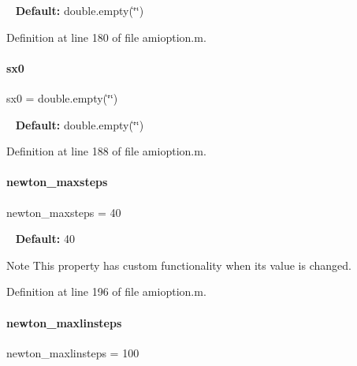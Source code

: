 ~\newline
{\bfseries Default\+:} double.\+empty(\char`\"{}\char`\"{}) 

Definition at line 180 of file amioption.\+m.

\mbox{\label{classamioption_ae40f9a7172d3a41725c151afaec347f7}} 
\paragraph{\texorpdfstring{sx0}{sx0}}
{\footnotesize\ttfamily sx0 = double.\+empty(\char`\"{}\char`\"{})}

~\newline
{\bfseries Default\+:} double.\+empty(\char`\"{}\char`\"{}) 

Definition at line 188 of file amioption.\+m.

\mbox{\label{classamioption_a003c445698766726237b11dc6e5120fe}} 
\paragraph{\texorpdfstring{newton\+\_\+maxsteps}{newton\_maxsteps}}
{\footnotesize\ttfamily newton\+\_\+maxsteps = 40}

~\newline
{\bfseries Default\+:} 40

\begin{DoxyNote}{Note}
This property has custom functionality when its value is changed. 
\end{DoxyNote}


Definition at line 196 of file amioption.\+m.

\mbox{\label{classamioption_abea544569240b7cfcb1505d125a3b51b}} 
\paragraph{\texorpdfstring{newton\+\_\+maxlinsteps}{newton\_maxlinsteps}}
{\footnotesize\ttfamily newton\+\_\+maxlinsteps = 100}

